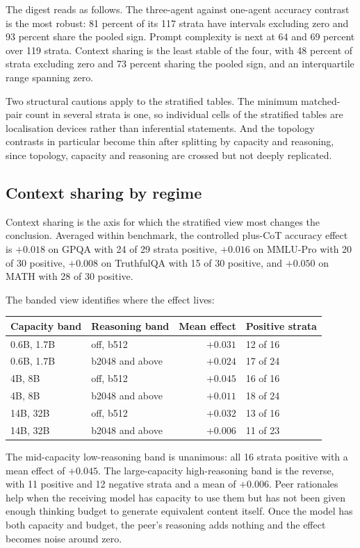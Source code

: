 The digest reads as follows. The three-agent against one-agent accuracy contrast is the
most robust: 81 percent of its 117 strata have intervals excluding zero and 93 percent
share the pooled sign. Prompt complexity is next at 64 and 69 percent over 119 strata.
Context sharing is the least stable of the four, with 48 percent of strata excluding zero
and 73 percent sharing the pooled sign, and an interquartile range spanning zero.

Two structural cautions apply to the stratified tables. The minimum matched-pair count in
several strata is one, so individual cells of the stratified tables are localisation
devices rather than inferential statements. And the topology contrasts in particular become
thin after splitting by capacity and reasoning, since topology, capacity and reasoning are
crossed but not deeply replicated.

\subsection{Context sharing by regime}

Context sharing is the axis for which the stratified view most changes the conclusion.
Averaged within benchmark, the controlled plus-CoT accuracy effect is $+0.018$ on GPQA
with 24 of 29 strata positive, $+0.016$ on MMLU-Pro with 20 of 30 positive, $+0.008$ on
TruthfulQA with 15 of 30 positive, and $+0.050$ on MATH with 28 of 30 positive.

The banded view identifies where the effect lives:

\begin{center}
\small
\begin{tabular}{llrl}
\toprule
Capacity band & Reasoning band & Mean effect & Positive strata \\
\midrule
0.6B, 1.7B & off, b512 & $+0.031$ & 12 of 16 \\
0.6B, 1.7B & b2048 and above & $+0.024$ & 17 of 24 \\
4B, 8B & off, b512 & $+0.045$ & 16 of 16 \\
4B, 8B & b2048 and above & $+0.011$ & 18 of 24 \\
14B, 32B & off, b512 & $+0.032$ & 13 of 16 \\
14B, 32B & b2048 and above & $+0.006$ & 11 of 23 \\
\bottomrule
\end{tabular}
\end{center}

The mid-capacity low-reasoning band is unanimous: all 16 strata positive with a mean effect
of $+0.045$. The large-capacity high-reasoning band is the reverse, with 11 positive and 12
negative strata and a mean of $+0.006$. Peer rationales help when the receiving model has
capacity to use them but has not been given enough thinking budget to generate equivalent
content itself. Once the model has both capacity and budget, the peer's reasoning adds
nothing and the effect becomes noise around zero.


